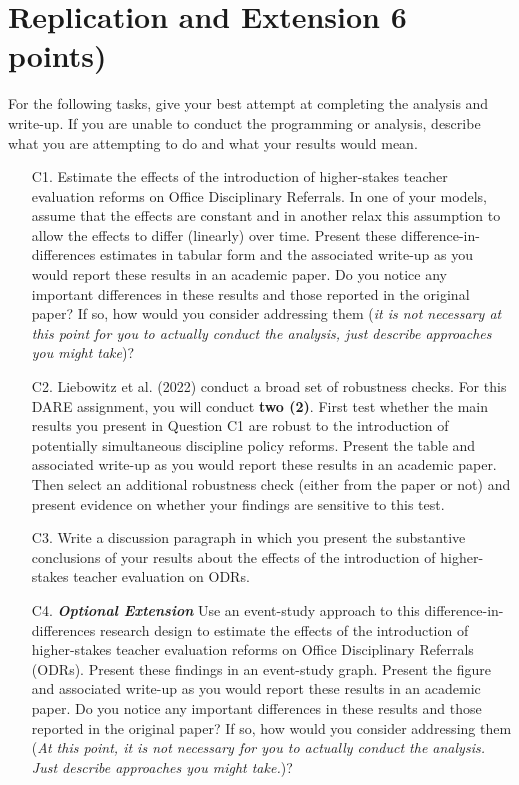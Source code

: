 \documentclass[a4paper, 11pt]{article}
\begin{document}
\begin{enumerate}
\end{enumerate}

\section{Replication and Extension 6 points)}
For the following tasks, give your best attempt at completing the analysis and write-up. If you are unable to conduct the programming or analysis, describe what you are attempting to do and what your results would mean.

\begin{enumerate}
	\item[C1.] Estimate the effects of the introduction of higher-stakes teacher evaluation reforms on Office Disciplinary Referrals. In one of your models, assume that the effects are constant and in another relax this assumption to allow the effects to differ (linearly) over time. Present these difference-in-differences estimates in tabular form and the associated write-up as you would report these results in an academic paper. Do you notice any important differences in these results and those reported in the original paper? If so, how would you consider addressing them (\textit{it is not necessary at this point for you to actually conduct the analysis, just describe approaches you might take})?
	\item[C2.] Liebowitz et al. (2022) conduct a broad set of robustness checks. For this DARE assignment, you will conduct \textbf{two (2)}. First test whether the main results you present in Question C1 are robust to the introduction of potentially simultaneous discipline policy reforms. Present the table and associated write-up as you would report these results in an academic paper. Then select an additional robustness check (either from the paper or not) and present evidence on whether your findings are sensitive to this test.
	\item[C3.] Write a discussion paragraph in which you present the substantive conclusions of your results about the effects of the introduction of higher-stakes teacher evaluation on ODRs.
	\item[C4.]  \textbf{\textit{Optional Extension}} Use an event-study approach to this difference-in-differences research design to estimate the effects of the introduction of higher-stakes teacher evaluation reforms on Office Disciplinary Referrals (ODRs). Present these findings in an event-study graph. Present the figure and associated write-up as you would report these results in an academic paper. Do you notice any important differences in these results and those reported in the original paper? If so, how would you consider addressing them (\textit{At this point, it is not necessary for you to actually conduct the analysis. Just describe approaches you might take.})?

\end{enumerate}
\end{document}
